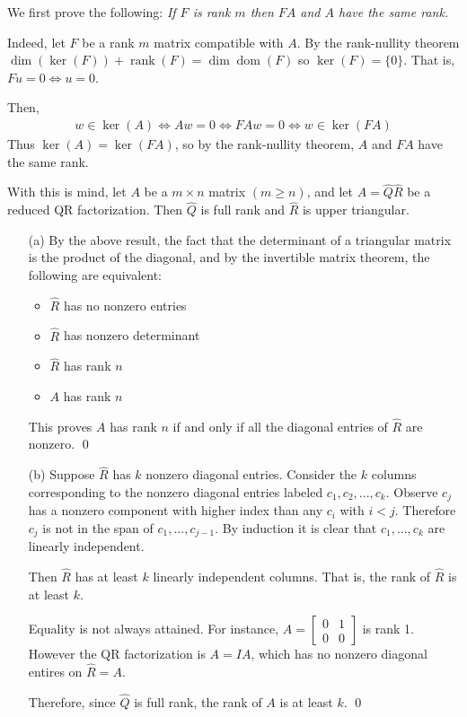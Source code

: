 \documentclass[10pt]{article}
\begin{document}
\begin{solution}[Solution]
We first prove the following: \textit{If \( F \) is rank \( m \) then \( FA \) and \( A \) have the same rank.}

    Indeed, let \( F \) be a rank \( m \) matrix compatible with \( A \). By the rank-nullity theorem \( \dim(\ker(F)) + \operatorname{rank}(F) = \dim\operatorname{dom}(F) \) so \( \ker(F)=\{0\} \). That is, \( Fu=0 \Leftrightarrow u=0 \). 

Then, 
\begin{align*}
    w\in\ker(A) \Leftrightarrow Aw=0 \Leftrightarrow FAw=0 \Leftrightarrow w\in\ker(FA)
\end{align*}
Thus \( \ker(A) = \ker(FA) \), so by the rank-nullity theorem, \( A \) and \( FA \) have the same rank.

With this is mind, let \( A \) be a \( m\times n \) matrix \( (m\geq n) \), and let \( A=\hat{Q}\hat{R} \) be a reduced QR factorization. Then \( \hat{Q} \) is full rank and \( \hat{R} \) is upper triangular.

\begin{enumerate}
    \item[(a)] By the above result, the fact that the determinant of a triangular matrix is the product of the diagonal, and by the invertible matrix theorem, the following are equivalent:
        \begin{itemize}[nolistsep]
           \item \( \hat{R} \) has no nonzero entries
           \item\( \hat{R} \) has nonzero determinant 
           \item \( \hat{R} \) has rank \( n \) 
           \item \( A \) has rank \( n \) 
        \end{itemize}
        This proves \( A \) has rank \( n \) if and only if all the diagonal entries of \( \hat{R} \) are nonzero. \qed    
    \item[(b)] Suppose \( \hat{R} \) has \( k \) nonzero diagonal entries. Consider the \( k \) columns corresponding to the nonzero diagonal entries labeled \( c_1, c_2, ..., c_k \). Observe \( c_j \) has a nonzero component with higher index than any \( c_i \) with \( i<j \). Therefore \( c_j \) is not in the span of \( c_1, ..., c_{j-1} \). By induction it is clear that \( c_1, ..., c_k \) are linearly independent.

        Then \( \hat{R} \) has at least \( k \) linearly independent columns. That is, the rank of \( \hat{R} \) is at least \( k \).

        Equality is not always attained. For instance, \( A=\left[\begin{array}{cc}0 & 1\\0 & 0\end{array}\right] \) is rank 1. However the QR factorization is \( A=IA \), which has no nonzero diagonal entires on \( \hat{R}=A \).

       Therefore, since \( \hat{Q} \) is full rank, the rank of \( A \) is at least \( k \). \qed
\end{enumerate}

\end{solution}
\end{document}
